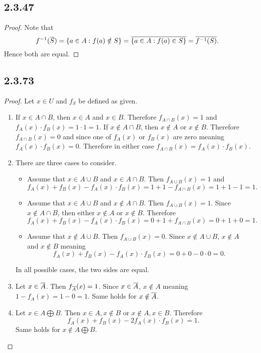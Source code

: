 \documentclass[12pt,titlepage]{extarticle}
\begin{document}
\subsection*{2.3.47}
\begin{proof}
    Note that
    \[
        f^{-1}(\overline{S}) = \qty{a \in A : f(a) \notin S} = \overline{\qty{a \in A : f(a) \in S}} = \overline{f^{-1}(S)}
    .\]
    Hence both are equal.
\end{proof}

\subsection*{2.3.73}
\begin{proof}
    Let $x \in U$ and $f_S$ be defined as given.
    \begin{enumerate}[label=\alph*)]
        \item %
        If $x \in A \cap B$, then $x \in A$ and $x \in B$. Therefore $f_{A \cap B}(x) = 1$ and $f_{A}(x) \cdot f_{B}(x) = 1 \cdot 1 = 1$. If $x \notin A \cap B$, then $x \notin A$ or $x \notin B$. Therefore $f_{A \cap B}(x) = 0$ and since one of $f_{A}(x)$ or $f_{B}(x)$ are zero meaning $f_{A}(x) \cdot f_{B}(x) = 0$. Therefore in either case $f_{A \cap B}(x) = f_{A}(x) \cdot f_{B}(x)$.
        \item %
        There are three cases to consider.
        \begin{itemize}
            \item Assume that $x \in A \cup B$ and $x \in A \cap B$. Then $f_{A \cup B}(x) = 1$ and 
            \[
                f_A(x) + f_B(x) - f_A(x) \cdot f_B(x) = 1 + 1 - f_{A\cap B}(x) = 1 + 1 - 1 = 1
            .\]
        \item Assume that $x \in A \cup B$ and $x \notin A \cap B$. Then $f_{A \cup B}(x) = 1$. Since $x \notin A \cap B$, then either $x \notin A$ or $x \notin B$. Therefore
            \[
                f_A(x) + f_B(x) - f_A(x) \cdot f_B(x) = 0 + 1 + f_{A \cap B}(x) = 0 + 1 + 0 = 1
            .\]
        \item Assume that $x \notin A \cup B$. Then $f_{A \cup B}(x) = 0$. Since $x \notin A \cup B$, $x \notin A$ and $x \notin B$ meaning
            \[
                f_A(x) + f_B(x) - f_A(x) \cdot f_B(x) = 0 + 0 - 0 \cdot 0 = 0
            .\]
        \end{itemize}
        In all possible cases, the two sides are equal.
        \item %
        Let $x \in \overline{A}$. Then $f_{\overline{A}}(x) = 1$. Since $x \in \overline{A}$, $x \notin A$ meaning $1 - f_A(x) = 1 - 0 = 1$. Same holds for $x \notin \overline{A}$.
        \item %
        Let $x \in A \bigoplus B$. Then $x \in A, x \notin B$ or $x \notin A, x \in B$. Therefore
        \[
            f_A(x) + f_B(x) - 2 f_A(x) \cdot f_B(x) = 1
        .\]
        Same holds for $x \notin A \bigoplus B$.
    \end{enumerate}
\end{proof}
\end{document}
